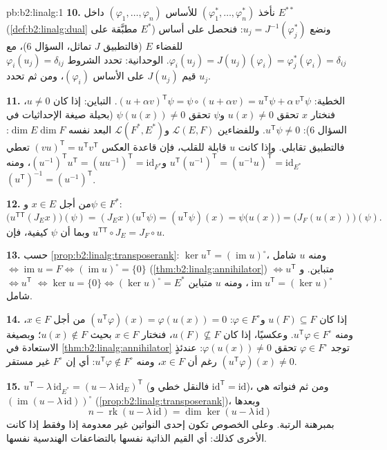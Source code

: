 \begin{solution}{pb:b2:linalg:1}
\textbf{10.} نأخذ  $(\varphi_1^*, \dots,
\varphi_n^*)$ للأساس $(\varphi_1, \dots, \varphi_n)$ داخل $E^{**}$
(\cref{def:b2:linalg:dual} مطبَّقة على $E^*$) ونضع $u_j =
J^{-1}(\varphi_j^*)$: فنحصل على أساس للفضاء $E$ (فالتطبيق $J$ تماثل،
السؤال 6)، مع $\varphi_i(u_j) = J(u_j)(\varphi_i) =
\varphi_j^*(\varphi_i) = \delta_{ij}$. الوحدانية: تحدد الشروط
$\varphi_i(u_j) = \delta_{ij}$ قيم $J(u_j)$ على الأساس
$(\varphi_i)$، ومن ثم تحدد $u_j$.

\textbf{11.} الخطية: $(u + \alpha v)^{\mathsf T}\psi = \psi
\circ (u + \alpha v) = u^{\mathsf T}\psi + \alpha\, v^{\mathsf
T}\psi$. التباين: إذا كان $u \neq 0$، فنختار $x$ تحقق $u(x) \neq 0$
و$\psi$ تحقق $\psi(u(x)) \neq 0$ (بحيلة صيغة الإحداثيات في السؤال 6):
$u^{\mathsf T}\psi \neq 0$. وللفضاءين $\mathcal{L}(E,F)$
و$\mathcal{L}(F^*, E^*)$ البعد نفسه $\dim E \dim F$:
فالتطبيق تقابلي. وإذا كانت $u$ قابلة للقلب، فإن قاعدة العكس $(vu)^{\mathsf
T} = u^{\mathsf T}v^{\mathsf T}$ تعطي $u^{\mathsf
T}(u^{-1})^{\mathsf T} = (u^{-1}u)^{\mathsf T} =
\mathrm{id}_{E^*}$ و$(u^{-1})^{\mathsf T}u^{\mathsf T} =
(uu^{-1})^{\mathsf T} = \mathrm{id}_{F^*}$، ومنه $(u^{\mathsf
T})^{-1} = (u^{-1})^{\mathsf T}$.

\textbf{12.} من أجل $x \in E$ و$\psi \in F^*$:
\[
\bigl(u^{\mathsf T\mathsf T}(J_E x)\bigr)(\psi)
= (J_E x)\bigl(u^{\mathsf T}\psi\bigr)
= (u^{\mathsf T}\psi)(x)
= \psi\bigl(u(x)\bigr)
= \bigl(J_F(u(x))\bigr)(\psi).
\]
وبما أن $\psi$ كيفية، فإن $u^{\mathsf T\mathsf T} \circ J_E = J_F
\circ u$.

\textbf{13.} حسب \cref{prop:b2:linalg:transposerank}: $\ker
u^{\mathsf T} = (\operatorname{im} u)^\circ$، ومنه $u$ شامل
$\iff \operatorname{im} u = F \iff (\operatorname{im}u)^\circ =
\{0\}$ (\cref{thm:b2:linalg:annihilator}) $\iff u^{\mathsf T}$
متباين. و$\operatorname{im} u^{\mathsf T} = (\ker
u)^\circ$، ومنه $u$ متباين $\iff \ker u = \{0\} \iff (\ker
u)^\circ = E^*$ $\iff u^{\mathsf T}$ شامل.

\textbf{14.} إذا كان $u(F) \subseteq F$ و$\varphi \in F^\circ$:
$(u^{\mathsf T}\varphi)(x) = \varphi(u(x)) = 0$ من أجل $x \in F$، ومنه
$u^{\mathsf T}\varphi \in F^\circ$. وعكسيًا، إذا كان $u(F)
\not\subseteq F$، فنختار $x \in F$ بحيث $u(x) \notin F$؛ وبصيغة
الاستعادة في \cref{thm:b2:linalg:annihilator} توجد
$\varphi \in F^\circ$ تحقق $\varphi(u(x)) \neq 0$: عندئذٍ
$(u^{\mathsf T}\varphi)(x) \neq 0$ رغم أن $x \in F$، ومنه
$u^{\mathsf T}\varphi \notin F^\circ$: أي إن $F^\circ$ غير مستقر.

\textbf{15.} $u^{\mathsf T} - \lambda\,\mathrm{id}_{E^*} = (u -
\lambda\,\mathrm{id}_E)^{\mathsf T}$ (فالنقل خطي و
$\mathrm{id}^{\mathsf T} = \mathrm{id}$)، ومن ثم فنواته هي
$(\operatorname{im}(u - \lambda\,\mathrm{id}))^\circ$
(\cref{prop:b2:linalg:transposerank})، وبعدها
\[
n - \operatorname{rk}(u - \lambda\,\mathrm{id})
= \dim\ker(u - \lambda\,\mathrm{id})
\]
بمبرهنة الرتبة. وعلى الخصوص تكون إحدى النواتين غير معدومة إذا وفقط إذا كانت
الأخرى كذلك: أي القيم الذاتية نفسها بالتضاعفات الهندسية نفسها.


\end{solution}
